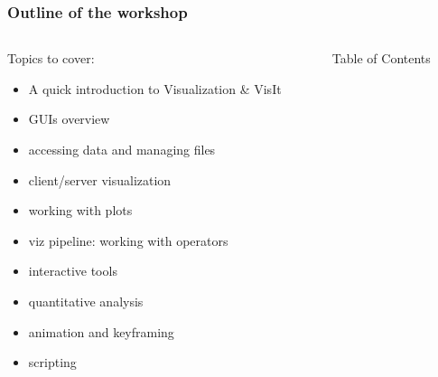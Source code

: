 \documentclass[dvipsnames]{beamer}
\begin{document}
\begin{frame}
\frametitle{Outline of the workshop}
\vspace{-3.5mm}
\begin{columns}
\begin{column}{5.5cm}
  \begin{block}{Topics to cover:}
    \begin{itemize}\itemsep3pt
	\item A quick introduction to Visualization \& VisIt
	\item GUIs overview
	\item accessing data and managing files
	\item client/server visualization
	\item working with plots%
	\item viz pipeline: working with operators%
	\item interactive tools%
	\item quantitative analysis
	\item animation and keyframing
	\item scripting 
    \end{itemize}
  \end{block}
\end{column}
\begin{column}{5.5cm}
  \begin{beamerboxesrounded}{Table of Contents}
  \vspace{2.5mm}
  \begin{spacing}{1.15}
	\tableofcontents%
  \end{spacing}
  \end{beamerboxesrounded}
\end{column}
\end{columns}
\end{frame}
\end{document}
